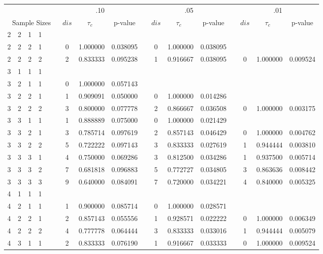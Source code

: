 \begin{appendix}
\begin{longtable}[h]{rrrcccccccccccccc}
   & && && &  \multicolumn{3}{c}{.10} &&  \multicolumn{3}{c}{.05} &&  \multicolumn{3}{c}{.01} \\  \cline{7-9} \cline{11-13} \cline{15-17}
\multicolumn{6}{c}{Sample Sizes} &  $dis$  & $\tau_c$ \, & p-value &&  $dis$  & $\tau_c$ \, & p-value &&  $dis$  & $\tau_c$ \,& p-value \\ \hline
2	&	2	&	1	&	1	&&&		&		&		&&		&		&		&&		&		&		\\
2	&	2	&	2	&	1	&&&	0	&	1.000000	&	0.038095	&&	0	&	1.000000	&	0.038095	&&		&		&		\\
2	&	2	&	2	&	2	&&&	2	&	0.833333	&	0.095238	&&	1	&	0.916667	&	0.038095	&&	0	&	1.000000	&	0.009524	\\
3	&	1	&	1	&	1	&&&		&		&		&&		&		&		&&		&		&		\\
3	&	2	&	1	&	1	&&&	0	&	1.000000	&	0.057143	&&		&		&		&&		&		&		\\
3	&	2	&	2	&	1	&&&	1	&	0.909091	&	0.050000	&&	0	&	1.000000	&	0.014286	&&		&		&		\\
3	&	2	&	2	&	2	&&&	3	&	0.800000	&	0.077778	&&	2	&	0.866667	&	0.036508	&&	0	&	1.000000	&	0.003175	\\
3	&	3	&	1	&	1	&&&	1	&	0.888889	&	0.075000	&&	0	&	1.000000	&	0.021429	&&		&		&		\\
3	&	3	&	2	&	1	&&&	3	&	0.785714	&	0.097619	&&	2	&	0.857143	&	0.046429	&&	0	&	1.000000	&	0.004762	\\
3	&	3	&	2	&	2	&&&	5	&	0.722222	&	0.097143	&&	3	&	0.833333	&	0.027619	&&	1	&	0.944444	&	0.003810	\\
3	&	3	&	3	&	1	&&&	4	&	0.750000	&	0.069286	&&	3	&	0.812500	&	0.034286	&&	1	&	0.937500	&	0.005714	\\
3	&	3	&	3	&	2	&&&	7	&	0.681818	&	0.096883	&&	5	&	0.772727	&	0.034805	&&	3	&	0.863636	&	0.008442	\\
3	&	3	&	3	&	3	&&&	9	&	0.640000	&	0.084091	&&	7	&	0.720000	&	0.034221	&&	4	&	0.840000	&	0.005325	\\
4	&	1	&	1	&	1	&&&		&		&		&&		&		&		&&		&		&		\\
4	&	2	&	1	&	1	&&&	1	&	0.900000	&	0.085714	&&	0	&	1.000000	&	0.028571	&&		&		&		\\
4	&	2	&	2	&	1	&&&	2	&	0.857143	&	0.055556	&&	1	&	0.928571	&	0.022222	&&	0	&	1.000000	&	0.006349	\\
4	&	2	&	2	&	2	&&&	4	&	0.777778	&	0.064444	&&	3	&	0.833333	&	0.033016	&&	1	&	0.944444	&	0.005079	\\
4	&	3	&	1	&	1	&&&	2	&	0.833333	&	0.076190	&&	1	&	0.916667	&	0.033333	&&	0	&	1.000000	&	0.009524	\\

\end{longtable}
\end{appendix}
